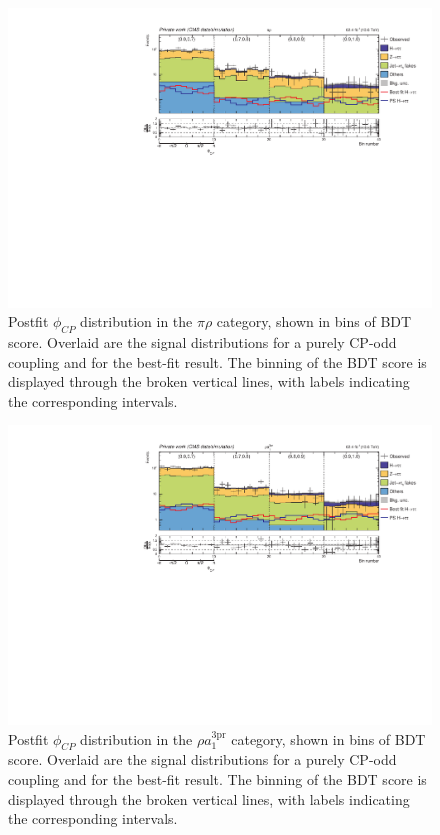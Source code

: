 \begin{figure}[!htbp]
    \centering
    \includegraphics[width=1\textwidth]{Figures/Chapter7/postfit/htt_tt_7_13p6TeV.pdf}
    \caption[Postfit $\phi_{CP}$ distribution in the $\pi\rho$ category.]
    {Postfit $\phi_{CP}$ distribution in the $\pi\rho$ category, shown in bins of \ac{BDT} score. Overlaid are the signal distributions for a purely CP-odd coupling and for the best-fit result. The binning of the BDT score is displayed through the broken vertical lines, with labels indicating the corresponding intervals.}
    \label{Figure:Chapter7_Postfit_Unrolled_2}
\end{figure}

\begin{figure}[!htbp]
    \centering
    \includegraphics[width=1\textwidth]{Figures/Chapter7/postfit/htt_tt_5_13p6TeV.pdf}
    \caption[Postfit $\phi_{CP}$ distribution in the $\rho a_1^\text{3pr}$ category.]
    {Postfit $\phi_{CP}$ distribution in the $\rho a_1^\text{3pr}$ category, shown in bins of \ac{BDT} score. Overlaid are the signal distributions for a purely CP-odd coupling and for the best-fit result. The binning of the BDT score is displayed through the broken vertical lines, with labels indicating the corresponding intervals.}
    \label{Figure:Chapter7_Postfit_Unrolled_3}
\end{figure}

